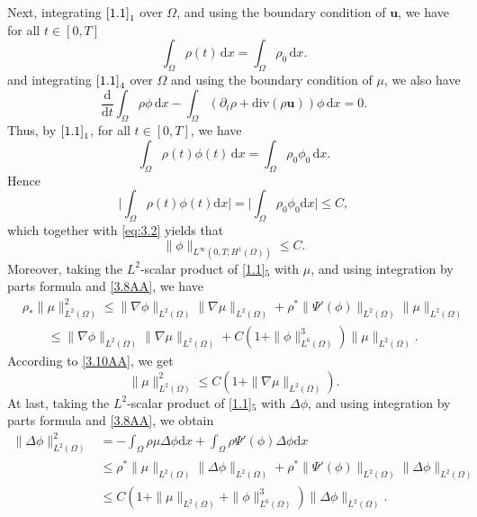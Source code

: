 \documentclass[11pt]{article}
\numberwithin{equation}{section}
\begin{document}
Next, integrating \(\eqref{1.1}_1\) over \(\Omega\), and using the boundary condition of \(\mathbf{u}\), we have for all \( t \in [0,T] \)
\begin{equation}\label{3.8AA}
\int_{\Omega} \rho(t) \, \mathrm{d}x = \int_{\Omega} \rho_0 \, \mathrm{d}x.
\end{equation}
and  integrating \(\eqref{1.1}_4\) over \(\Omega\) and using the boundary condition of \(\mu\), we also have
\[\frac{\mathrm{d}}{\mathrm{d}t} \int_{\Omega} \rho \phi \, \mathrm{d}x - \int_{\Omega} (\partial_t \rho + \mathrm{div}(\rho \mathbf{u})) \phi \, \mathrm{d}x = 0.\]
Thus, by \(\eqref{1.1}_1\), for all \( t \in [0,T] \),  we have
\begin{equation}\label{3.9AA}
\int_{\Omega} \rho(t) \phi(t) \, \mathrm{d}x = \int_{\Omega} \rho_0 \phi_0 \, \mathrm{d}x.
\end{equation}
Hence
\begin{equation*}
\big|\int_{\Omega}\rho(t)\phi(t)\mathrm{d}x\big|=\big|\int_{\Omega}\rho_{0}\phi_{0}\mathrm{d}x\big|\leq C,
\end{equation*}
which  together with \eqref{eq:3.2} yields  that
\begin{equation}\label{3.10AA}
\|\phi\|_{L^{\infty}(0,T;H^1(\Omega))} \leq C.
\end{equation}
Moreover, taking the $L^2$-scalar product of \eqref{1.1}$_{5}$ with $\mu$, and  using integration by
parts formula and \eqref{3.8AA}, we have
\begin{equation*}\begin{split}
& \rho_* \|\mu\|_{L^2(\Omega)}^2 \leq \|\nabla\phi\|_{L^2(\Omega)} \|\nabla\mu\|_{L^2(\Omega)} + \rho^* \|\Psi'(\phi)\|_{L^2(\Omega)} \|\mu\|_{L^2(\Omega)}  \\
& \hspace{2em} \leq \|\nabla\phi\|_{L^2(\Omega)} \|\nabla\mu\|_{L^2(\Omega)} + C(1 + \|\phi\|_{L^6(\Omega)}^3) \|\mu\|_{L^2(\Omega)}.
\end{split}\end{equation*}
According to \eqref{3.10AA}, we get
\begin{equation}\label{4.30AA}
\|\mu\|_{L^2(\Omega)}^2 \leq C(1 + \|\nabla\mu\|_{L^2(\Omega)}).
\end{equation}
At last, taking the $L^2$-scalar product of \eqref{1.1}$_{5}$ with $\Delta\phi$, and  using integration by
parts formula  and \eqref{3.8AA}, we obtain
\begin{equation}\label{4.32AA}\begin{split}
\|\Delta\phi\|_{L^2(\Omega)}^2 &= -\int_{\Omega} \rho \mu \Delta\phi \mathrm{d}x + \int_{\Omega} \rho \Psi'(\phi) \Delta\phi \mathrm{d}x \\
& \leq \rho^* \|\mu\|_{L^2(\Omega)} \|\Delta\phi\|_{L^2(\Omega)} + \rho^{\ast} \|\Psi'(\phi)\|_{L^2(\Omega)} \|\Delta\phi\|_{L^2(\Omega)}\\
& \leq C(1 + \|\mu\|_{L^2(\Omega)} + \|\phi\|_{L^6(\Omega)}^3) \|\Delta\phi\|_{L^2(\Omega)}.
\end{split}\end{equation}
\end{document}
